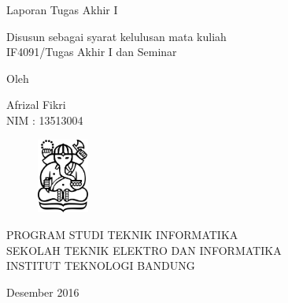 \clearpage
\pagestyle{empty}

\begin{center}
\smallskip

    \Large \bfseries \MakeUppercase{\thetitle}
    \vfill

    \Large Laporan Tugas Akhir I
    \vfill

    \large Disusun sebagai syarat kelulusan mata kuliah \\
    IF4091/Tugas Akhir I dan Seminar

    \vfill

    \large Oleh

    \Large Afrizal Fikri \\
    NIM : 13513004

    \vfill
    \begin{figure}[h]
        \centering
      	\includegraphics[width=0.15\textwidth]{resources/cover-ganesha}
    \end{figure}
    \vfill

    \large
    \uppercase{
        Program Studi Teknik Informatika \\
        Sekolah Teknik Elektro dan Informatika \\
        Institut Teknologi Bandung
    }

    Desember 2016

\end{center}

\clearpage
